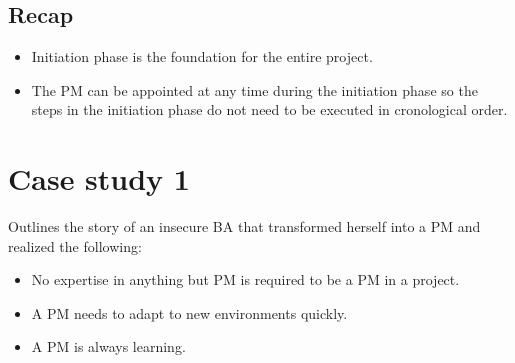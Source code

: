 \subsection{Recap}
\begin{itemize}
    \item Initiation phase is the foundation for the entire project.
    \item The PM can be appointed at any time during the initiation phase so the steps in the initiation phase do not need to be executed in cronological order.
\end{itemize}

\section{Case study 1}
Outlines the story of an insecure BA that transformed herself into a PM and realized the following: 
\begin{itemize}
    \item No expertise in anything but PM is required to be a PM in a project.
    \item A PM needs to adapt to new environments quickly.
    \item A PM is always learning.
\end{itemize}

